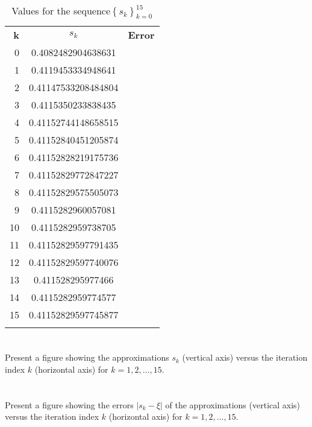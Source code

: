 \documentclass{article}
\begin{document}
\begin{table}[H]
    \centering
    \begin{tabular}{|r|c|c|}
        \Xhline{1 pt}
         \textbf{k}& \textbf{$s_k$}& \textbf{Error}  \\
         \Xhline{1.5 pt}
         0 & 0.4082482904638631&\\
         \Xhline{1 pt}
         1 & 0.4119453334948641&\\
         \Xhline{1 pt}
         2 & 0.41147533208484804&\\
         \Xhline{1 pt}
         3 & 0.4115350233838435&\\
         \Xhline{1 pt}
         4 & 0.41152744148658515 &\\
         \Xhline{1 pt}
         5 & 0.41152840451205874 & \\
          \Xhline{1 pt}
         6 & 0.41152828219175736 & \\
          \Xhline{1 pt}
         7 & 0.41152829772847227 &\\
          \Xhline{1 pt}
         8 & 0.41152829575505073 &\\
          \Xhline{1 pt}
         9 & 0.4115282960057081 &\\
          \Xhline{1 pt}
         10 & 0.4115282959738705 &\\
          \Xhline{1 pt}
         11 & 0.41152829597791435 &\\
          \Xhline{1 pt}
         12 & 0.41152829597740076 &\\
          \Xhline{1 pt}
         13 & 0.411528295977466 &\\
          \Xhline{1 pt}
         14 & 0.4115282959774577&\\
          \Xhline{1 pt}
         15 & 0.41152829597745877&\\
         \Xhline{1 pt}
    \end{tabular}
    \caption{Values for the sequence$\left\{ s_k\right\}_{k=0}^{15}$}
    \label{tab:15sequence}
\end{table}

\section{}
Present a figure showing the approximations $s_k$ (vertical axis) versus the iteration index $k$ (horizontal axis) for $k=1,2,\dots,15$.
\vspace{10mm}

\section{}
Present a figure showing the errors $|s_k - \xi|$ of the approximations (vertical axis) versus the iteration index $k$ (horizontal axis) for $k=1,2,\dots,15$.
\vspace{10mm}
\end{document}
